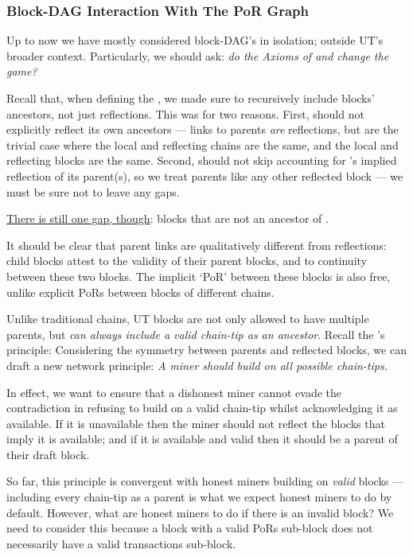 

\subsubsection{Block-DAG Interaction With The PoR Graph}

\label{sec:dags-and-the-por-graph}

Up to now we have mostly considered block-DAG's in isolation; outside UT's broader context.
Particularly, we should ask: \emph{do the Axioms of \AxOfAvailability and \AxOfMaximalReflection change the game?}

Recall that, when defining the \AxiomOfMaximalReflection, we made sure to recursively include blocks' ancestors, not just reflections.
This was for two reasons.
First, \BL should not explicitly reflect its own ancestors --- links to parents \emph{are} reflections, but are the trivial case where the local and reflecting chains are the same, and the local and reflecting blocks are the same.
Second, \BL should not skip accounting for \BR{}'s implied reflection of its parent(s), so we treat parents like any other reflected block --- we must be sure not to leave any gaps.

\ul{There is still one gap, though}: \cL blocks that are not an ancestor of \BL.

It should be clear that parent links are qualitatively different from reflections: child blocks attest to the validity of their parent blocks, and to continuity between these two blocks.
The implicit `PoR' between these blocks is also free, unlike explicit PoRs between blocks of different chains.

Unlike traditional chains, UT blocks are not only allowed to have multiple parents, but \emph{can always include a valid chain-tip as an ancestor}.
Recall the \AxiomOfMaximalReflection's principle: \emph{\PrincipleOfMaximalReflection} %
Considering the symmetry between parents and reflected blocks, we can draft a new network principle: \emph{A miner should build on all possible chain-tips.}

In effect, we want to ensure that a dishonest miner cannot evade the contradiction in refusing to build on a valid chain-tip whilst acknowledging it as available.
If it is unavailable then the miner should not reflect the blocks that imply it is available; and if it is available and valid then it should be a parent of their draft block.

So far, this principle is convergent with honest miners building on \emph{valid} blocks --- including every chain-tip as a parent is what we expect honest miners to do by default.
However, what are honest miners to do if there is an invalid block?
We need to consider this because a block with a valid PoRs sub-block does not necessarily have a valid transactions sub-block.

